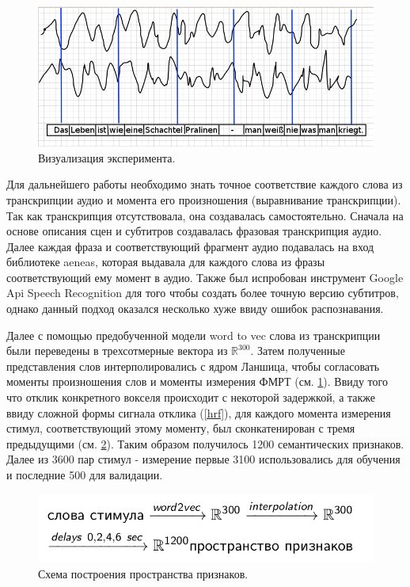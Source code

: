 \documentclass[pdftex,ptm,12pt,a4paper]{report}
\theoremstyle{definition}
\begin{document}
\begin{figure}[h]
\includegraphics[scale=0.5]{images/word_forrest.png}
\centering
\caption{Визуализация эксперимента.}
\label{interpolation}
\end{figure}

Для дальнейшего работы необходимо знать точное соответствие каждого слова из транскрипции аудио и момента его произношения (выравнивание транскрипции). Так как транскрипция отсутствовала, она создавалась самостоятельно. Сначала на основе описания сцен и субтитров создавалась фразовая транскрипция аудио. Далее каждая фраза и соответствующий фрагмент аудио подавалась на вход библиотеке aeneas, которая выдавала для каждого слова из фразы соответствующий ему момент в аудио. Также был испробован инструмент Google Api Speech Recognition для того чтобы создать более точную версию субтитров, однако данный подход оказался несколько хуже ввиду ошибок распознавания.

Далее с помощью предобученной модели word to vec слова из транскрипции были переведены в трехсотмерные вектора из $\mathbb{R}^{300}.$ Затем полученные представления слов интерполировались с ядром Ланшица, чтобы согласовать моменты произношения слов и моменты измерения ФМРТ (см. \ref{interpolation}). Ввиду того что отклик конкретного вокселя происходит с некоторой задержкой, а также ввиду сложной формы сигнала отклика (\ref{hrf}), для каждого момента измерения стимул, соответствующий этому моменту, был сконкатенирован с тремя предыдущими (см. \ref{schema}). Таким образом получилось 1200 семантических признаков. Далее из 3600 пар стимул - измерение первые 3100 использовались для обучения и последние 500 для валидации.

\begin{figure}[h]
\includegraphics[scale=0.4]{images/schema.png}
\centering
\caption{Схема построения пространства признаков.}
\label{schema}
\end{figure}
\end{document}
